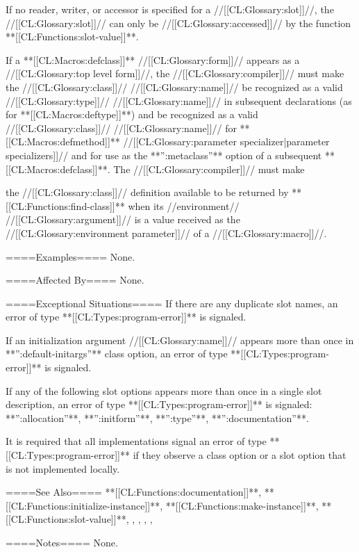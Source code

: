 If no reader, writer, or accessor is specified for a //[[CL:Glossary:slot]]//, the //[[CL:Glossary:slot]]// can only be //[[CL:Glossary:accessed]]// by the function **[[CL:Functions:slot-value]]**.

If a **[[CL:Macros:defclass]]** //[[CL:Glossary:form]]// appears as a //[[CL:Glossary:top level form]]//, the //[[CL:Glossary:compiler]]// must make the //[[CL:Glossary:class]]// //[[CL:Glossary:name]]// be recognized as a valid //[[CL:Glossary:type]]// //[[CL:Glossary:name]]// in subsequent declarations (as for **[[CL:Macros:deftype]]**) and be recognized as a valid //[[CL:Glossary:class]]// //[[CL:Glossary:name]]// for **[[CL:Macros:defmethod]]** //[[CL:Glossary:parameter specializer|parameter specializers]]// and for use as the **'':metaclass''** option of a subsequent **[[CL:Macros:defclass]]**. The //[[CL:Glossary:compiler]]// must make

the //[[CL:Glossary:class]]// definition available to be returned by **[[CL:Functions:find-class]]** when its //environment// //[[CL:Glossary:argument]]// is a value received as the //[[CL:Glossary:environment parameter]]// of a //[[CL:Glossary:macro]]//.

====Examples====
None.

====Affected By====
None.

====Exceptional Situations====
If there are any duplicate slot names, an error of type **[[CL:Types:program-error]]** is signaled.

If an initialization argument //[[CL:Glossary:name]]// appears more than once in **'':default-initargs''** class option, an error of type **[[CL:Types:program-error]]** is signaled.

If any of the following slot options appears more than once in a single slot description, an error of type **[[CL:Types:program-error]]** is signaled: **'':allocation''**, **'':initform''**, **'':type''**, **'':documentation''**.

It is required that all implementations signal an error of type **[[CL:Types:program-error]]** if they observe a class option or a slot option that is not implemented locally.

====See Also====
**[[CL:Functions:documentation]]**, **[[CL:Functions:initialize-instance]]**, **[[CL:Functions:make-instance]]**, **[[CL:Functions:slot-value]]**, {\secref\Classes}, {\secref\Inheritance}, {\secref\ClassReDef}, {\secref\DeterminingtheCPL}, {\secref\ObjectCreationAndInit}

====Notes====
None.

 
